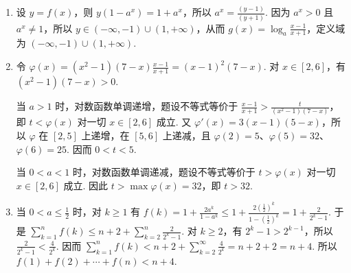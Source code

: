\begin{solution}
\begin{enumerate}
\item 设 \(y=f(x)\)，则 \(y(1-a^x)=1+a^x\)，所以 \(a^x=\frac{(y-1)}{(y+1)}\). 因为 \(a^x>0\) 且 \(a^x\ne1\)，所以 \(y\in(-\infty,-1)\cup(1,+\infty)\)，从而
\(g(x)=\log_a\frac{x-1}{x+1}\)，定义域为 \((-\infty,-1)\cup(1,+\infty)\).
\item 令 \(\varphi(x)=(x^2-1)(7-x)\frac{x-1}{x+1}=(x-1)^2(7-x)\). 对 \(x\in[2,6]\)，有 \((x^2-1)(7-x)>0\).

当 \(a>1\) 时，对数函数单调递增，题设不等式等价于
\(\frac{x-1}{x+1}>\frac{t}{(x^2-1)(7-x)}\)，即 \(t<\varphi(x)\) 对一切 \(x\in[2,6]\) 成立. 又 \(\varphi'(x)=3(x-1)(5-x)\)，所以 \(\varphi\) 在 \([2,5]\) 上递增，在 \([5,6]\) 上递减，且 \(\varphi(2)=5\)、\(\varphi(5)=32\)、\(\varphi(6)=25\). 因而 \(0<t<5\).

当 \(0<a<1\) 时，对数函数单调递减，题设不等式等价于 \(t>\varphi(x)\) 对一切 \(x\in[2,6]\) 成立. 因此 \(t>\max\varphi(x)=32\)，即 \(t>32\).
\item 当 \(0<a\leq\frac{1}{2}\) 时，对 \(k\geq1\) 有
\(f(k)=1+\frac{2a^k}{1-a^k}\leq1+\frac{2(\frac{1}{2})^k}{1-(\frac{1}{2})^k}=1+\frac{2}{2^k-1}\).
于是
\(\sum_{k=1}^n f(k)\leq n+2+\sum_{k=2}^n\frac{2}{2^k-1}\).
对 \(k\geq2\)，有 \(2^k-1>2^{k-1}\)，所以 \(\frac{2}{2^k-1}<\frac{4}{2^k}\). 因而
\(\sum_{k=1}^n f(k)<n+2+\sum_{k=2}^{\infty}\frac{4}{2^k}=n+2+2=n+4\).
所以 \(f(1)+f(2)+\cdots+f(n)<n+4\).
\end{enumerate}
\end{solution}
